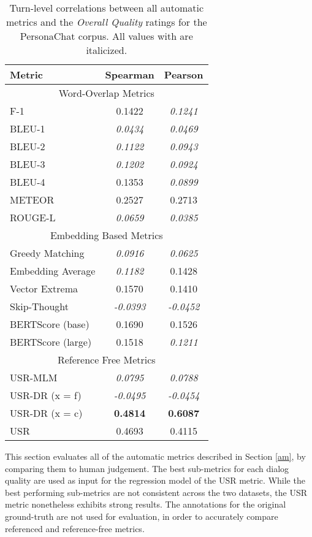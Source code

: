 \documentclass[11pt,a4paper]{article}
\begin{document}
\begin{table}
\centering
\begin{tabular}{|l|c|c|}
\hline
Metric                    & Spearman & Pearson  \\\hline
\multicolumn{3}{|c|}{Word-Overlap Metrics} \\ \hline
F-1 & 0.1422 & \textit{0.1241} \\
BLEU-1 & \textit{0.0434} & \textit{0.0469} \\
BLEU-2 & \textit{0.1122} & \textit{0.0943} \\
BLEU-3 & \textit{0.1202} & \textit{0.0924} \\
BLEU-4 & 0.1353 & \textit{0.0899} \\
METEOR & 0.2527 & 0.2713 \\
ROUGE-L & \textit{0.0659} & \textit{0.0385} \\ \hline
\multicolumn{3}{|c|}{Embedding Based Metrics} \\ \hline
Greedy Matching & \textit{0.0916} & \textit{0.0625} \\
Embedding Average & \textit{0.1182} & 0.1428 \\
Vector Extrema & 0.1570 & 0.1410 \\
Skip-Thought & \textit{-0.0393} & \textit{-0.0452} \\
BERTScore (base) & 0.1690 & 0.1526 \\
BERTScore (large) & 0.1518 & \textit{0.1211} \\ \hline
\multicolumn{3}{|c|}{Reference Free Metrics} \\ \hline
USR-MLM & \textit{0.0795} & \textit{0.0788} \\
USR-DR (x = f) & \textit{-0.0495} & \textit{-0.0454} \\
USR-DR (x = c) & \textbf{0.4814} & \textbf{0.6087} \\
USR & 0.4693 & 0.4115 \\ \hline
\end{tabular}
\caption{Turn-level correlations between all automatic metrics and the \textit{Overall Quality} ratings for the PersonaChat corpus. All values with  are italicized.}
\label{tab:turn_overall_pc}
\end{table}

This section evaluates all of the automatic metrics described in Section \ref{am}, by comparing them to human judgement. The best sub-metrics for each dialog quality are used as input for the regression model of the USR metric. While the best performing sub-metrics are not consistent across the two datasets, the USR metric nonetheless exhibits strong results. The annotations for the original ground-truth are not used for evaluation, in order to accurately compare referenced and reference-free metrics.
\end{document}
